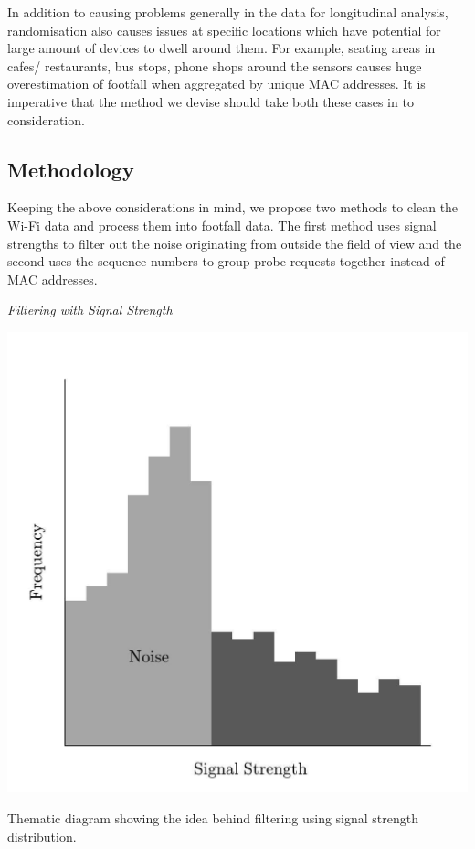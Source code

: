 In addition to causing problems generally in the data for longitudinal analysis, randomisation also causes issues at specific locations which have potential for large amount of devices to dwell around them.
For example, seating areas in cafes/ restaurants, bus stops, phone shops around the sensors causes huge overestimation of footfall when aggregated by unique MAC addresses.
It is imperative that the method we devise should take both these cases in to consideration.

\subsection{Methodology}
Keeping the above considerations in mind, we propose two methods to clean the Wi-Fi data and process them into footfall data.
The first method uses signal strengths to filter out the noise originating from outside the field of view and the second uses the sequence numbers to group probe requests together instead of MAC addresses.

\vspace{1.5em}\noindent\textit{Filtering with Signal Strength}\vspace{0.5em}

\begin{marginfigure}
  \includegraphics[trim={5 5 5 5},clip]{images/processing-method-signal.jpg}
  \caption{Thematic diagram showing the idea behind filtering using signal strength distribution.}
  \label{figure:processing:method:signal}
\end{marginfigure}

